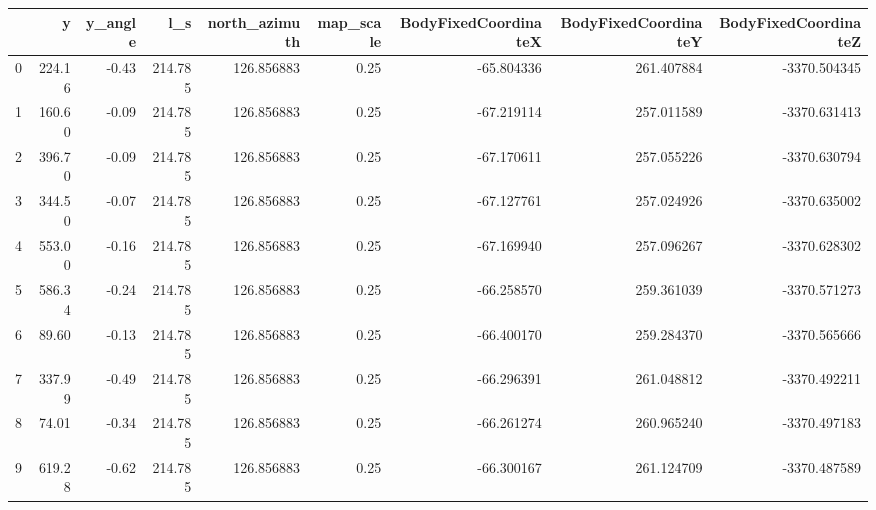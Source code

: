 \begin{tabular}{lrrrrrrrr}
\toprule
{} &       y &  y\_angle &      l\_s &  north\_azimuth &  map\_scale &  BodyFixedCoordinateX &  BodyFixedCoordinateY &  BodyFixedCoordinateZ \\
\midrule
0 &  224.16 &    -0.43 &  214.785 &     126.856883 &       0.25 &            -65.804336 &            261.407884 &          -3370.504345 \\
1 &  160.60 &    -0.09 &  214.785 &     126.856883 &       0.25 &            -67.219114 &            257.011589 &          -3370.631413 \\
2 &  396.70 &    -0.09 &  214.785 &     126.856883 &       0.25 &            -67.170611 &            257.055226 &          -3370.630794 \\
3 &  344.50 &    -0.07 &  214.785 &     126.856883 &       0.25 &            -67.127761 &            257.024926 &          -3370.635002 \\
4 &  553.00 &    -0.16 &  214.785 &     126.856883 &       0.25 &            -67.169940 &            257.096267 &          -3370.628302 \\
5 &  586.34 &    -0.24 &  214.785 &     126.856883 &       0.25 &            -66.258570 &            259.361039 &          -3370.571273 \\
6 &   89.60 &    -0.13 &  214.785 &     126.856883 &       0.25 &            -66.400170 &            259.284370 &          -3370.565666 \\
7 &  337.99 &    -0.49 &  214.785 &     126.856883 &       0.25 &            -66.296391 &            261.048812 &          -3370.492211 \\
8 &   74.01 &    -0.34 &  214.785 &     126.856883 &       0.25 &            -66.261274 &            260.965240 &          -3370.497183 \\
9 &  619.28 &    -0.62 &  214.785 &     126.856883 &       0.25 &            -66.300167 &            261.124709 &          -3370.487589 \\
\bottomrule
\end{tabular}
